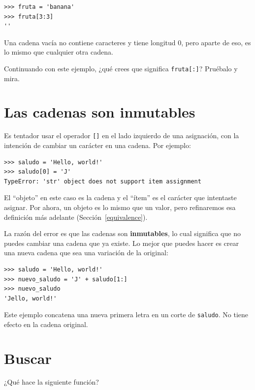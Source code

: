 \documentclass[10pt]{book}
\begin{document}
\begin{verbatim}
>>> fruta = 'banana'
>>> fruta[3:3]
''
\end{verbatim}
%
Una cadena vacía no contiene caracteres y tiene longitud 0, pero aparte
de eso, es lo mismo que cualquier otra cadena.

Continuando con este ejemplo, ¿qué crees que significa
{\tt fruta[:]}?  Pruébalo y mira.



\section{Las cadenas son inmutables}

Es tentador usar el operador {\tt []} en el lado izquierdo de una
asignación, con la intención de cambiar un carácter en una cadena.
Por ejemplo:

\begin{verbatim}
>>> saludo = 'Hello, world!'
>>> saludo[0] = 'J'
TypeError: 'str' object does not support item assignment
\end{verbatim}
%
El ``objeto'' en este caso es la cadena y el ``ítem'' es
el carácter que intentaste asignar.  Por ahora, un objeto es
lo mismo que un valor, pero refinaremos esa definición
más adelante (Sección~\ref{equivalence}).

La razón del error es que
las cadenas son {\bf inmutables}, lo cual significa que no puedes cambiar una
cadena que ya existe.  Lo mejor que puedes hacer es crear una nueva cadena
que sea una variación de la original:

\begin{verbatim}
>>> saludo = 'Hello, world!'
>>> nuevo_saludo = 'J' + saludo[1:]
>>> nuevo_saludo
'Jello, world!'
\end{verbatim}
%
Este ejemplo concatena una nueva primera letra en
un corte de {\tt saludo}.  No tiene efecto en
la cadena original.


\section{Buscar}
\label{find}

¿Qué hace la siguiente función?
\end{document}
